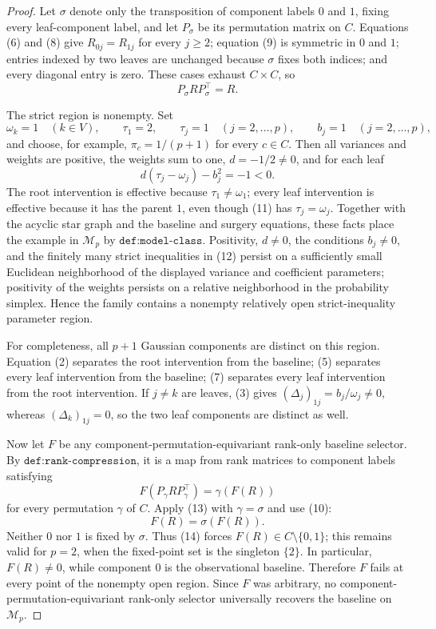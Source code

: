 \documentclass{article}
\begin{document}
\begin{proof}
Let \(\sigma\) denote only the transposition of component labels \(0\) and \(1\), fixing every leaf-component label, and let \(P_\sigma\) be its permutation matrix on \(C\).  Equations (6) and (8) give \(R_{0j}=R_{1j}\) for every \(j\geq2\); equation (9) is symmetric in \(0\) and \(1\); entries indexed by two leaves are unchanged because \(\sigma\) fixes both indices; and every diagonal entry is zero.  These cases exhaust \(C\times C\), so
\[
 P_\sigma R P_\sigma^{\top}=R.
 \tag{10}
\]

The strict region is nonempty.  Set
\[
 \omega_k=1\quad(k\in V),\qquad
 \tau_1=2,\qquad
 \tau_j=1\quad(j=2,\ldots,p),\qquad
 b_j=1\quad(j=2,\ldots,p),
 \tag{11}
\]
and choose, for example, \(\pi_c=1/(p+1)\) for every \(c\in C\).  Then all variances and weights are positive, the weights sum to one, \(d=-1/2\neq0\), and for each leaf
\[
 d(\tau_j-\omega_j)-b_j^2=-1<0.
 \tag{12}
\]
The root intervention is effective because \(\tau_1\neq\omega_1\); every leaf intervention is effective because it has the parent \(1\), even though (11) has \(\tau_j=\omega_j\).  Together with the acyclic star graph and the baseline and surgery equations, these facts place the example in \(\mathcal M_p\) by \(\texttt{def:model-class}\).  Positivity, \(d\neq0\), the conditions \(b_j\neq0\), and the finitely many strict inequalities in (12) persist on a sufficiently small Euclidean neighborhood of the displayed variance and coefficient parameters; positivity of the weights persists on a relative neighborhood in the probability simplex.  Hence the family contains a nonempty relatively open strict-inequality parameter region.

For completeness, all \(p+1\) Gaussian components are distinct on this region.  Equation (2) separates the root intervention from the baseline; (5) separates every leaf intervention from the baseline; (7) separates every leaf intervention from the root intervention.  If \(j\neq k\) are leaves, (3) gives \((\Delta_j)_{1j}=b_j/\omega_j\neq0\), whereas \((\Delta_k)_{1j}=0\), so the two leaf components are distinct as well.

Now let \(F\) be any component-permutation-equivariant rank-only baseline selector.  By \(\texttt{def:rank-compression}\), it is a map from rank matrices to component labels satisfying
\[
 F(P_\gamma R P_\gamma^{\top})=\gamma(F(R))
 \tag{13}
\]
for every permutation \(\gamma\) of \(C\).  Apply (13) with \(\gamma=\sigma\) and use (10):
\[
 F(R)=\sigma(F(R)).
 \tag{14}
\]
Neither \(0\) nor \(1\) is fixed by \(\sigma\).  Thus (14) forces \(F(R)\in C\setminus\{0,1\}\); this remains valid for \(p=2\), when the fixed-point set is the singleton \(\{2\}\).  In particular, \(F(R)\neq0\), while component \(0\) is the observational baseline.  Therefore \(F\) fails at every point of the nonempty open region.  Since \(F\) was arbitrary, no component-permutation-equivariant rank-only selector universally recovers the baseline on \(\mathcal M_p\).


\end{proof}
\end{document}
